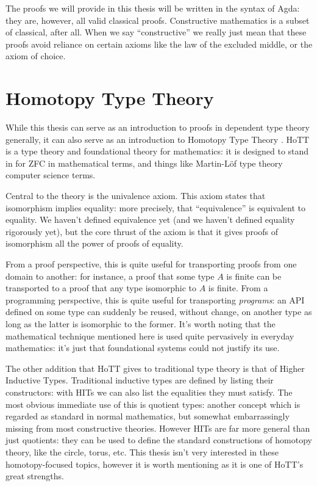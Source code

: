 The proofs we will provide in this thesis will be written in the syntax of
Agda: they are, however, all valid classical proofs.
Constructive mathematics is a subset of classical, after all.
When we say ``constructive'' we really just mean that these proofs avoid
reliance on certain axioms like the law of the excluded middle, or the axiom of
choice.
\section{Homotopy Type Theory}
While this thesis can serve as an introduction to proofs in dependent type
theory generally, it can also serve as an introduction to Homotopy Type Theory
\citep{hottbook}.
HoTT is a type theory and foundational theory for mathematics: it is designed to
stand in for ZFC in mathematical terms, and things like Martin-Löf type theory
computer science terms.

Central to the theory is the univalence axiom.
This axiom states that isomorphism implies equality: more precisely, that
``equivalence'' is equivalent to equality.
We haven't defined equivalence yet (and we haven't defined equality rigorously
yet), but the core thrust of the axiom is that it gives proofs of isomorphism
all the power of proofs of equality.

From a proof perspective, this is quite useful for transporting proofs from one
domain to another: for instance, a proof that some type \(A\) is finite can be
transported to a proof that any type isomorphic to \(A\) is finite.
From a programming perspective, this is quite useful for transporting
\emph{programs}: an API defined on some type can suddenly be reused, without
change, on another type as long as the latter is isomorphic to the former.
It's worth noting that the mathematical technique mentioned here is used quite
pervasively in everyday mathematics: it's just that foundational systems could
not justify its use.

The other addition that HoTT gives to traditional type theory is that of Higher
Inductive Types.
Traditional inductive types are defined by listing their constructors: with HITs
we can also list the equalities they must satisfy.
The most obvious immediate use of this is quotient types: another concept which
is regarded as standard in normal mathematics, but somewhat embarrassingly
missing from most constructive theories.
However HITs are far more general than just quotients: they can be used to
define the standard constructions of homotopy theory, like the circle, torus,
etc.
This thesis isn't very interested in these homotopy-focused topics, however it
is worth mentioning as it is one of HoTT's great strengths.

